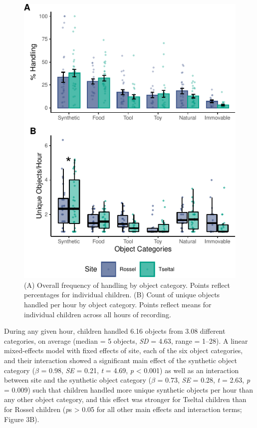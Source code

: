 \documentclass[10pt, letterpaper]{article}
\newenvironment{CodeChunk}{}{}
\begin{document}
\begin{CodeChunk}
\begin{figure}[!h]

{\centering \includegraphics{figs/overall-stats-fig-1} 

}

\caption[(A) Overall frequency of handling by object category]{(A) Overall frequency of handling by object category. Points reflect percentages for individual children. (B) Count of unique objects handled per hour by object category. Points reflect means for individual children across all hours of recording.}\label{fig:overall-stats-fig}
\end{figure}
\end{CodeChunk}

During any given hour, children handled 6.16 objects from 3.08 different
categories, on average (median = 5 objects, \emph{SD} = 4.63, range =
1--28). A linear mixed-effects model with fixed effects of site, each of
the six object categories, and their interaction showed a significant
main effect of the synthetic object category (\(\beta\) = 0.98,
\emph{SE} = 0.21, \emph{t} = 4.69, \emph{p} \textless{} 0.001) as well
as an interaction between site and the synthetic object category
(\(\beta\) = 0.73, \emph{SE} = 0.28, \emph{t} = 2.63, \emph{p} = 0.009)
such that children handled more unique synthetic objects per hour than
any other object category, and this effect was stronger for Tseltal
children than for Rossel children (\emph{p}s \textgreater{} 0.05 for all
other main effects and interaction terms; Figure 3B).
\end{document}
